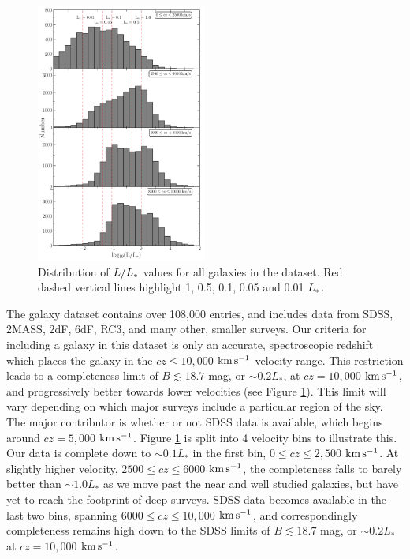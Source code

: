 \documentclass[twocolumn,tighten]{aastex6}
\begin{document}
\begin{figure}[b!]
        \centering
        \vspace{0pt}
        \includegraphics[width=0.50\textwidth]{fig1.pdf}
        \caption{\small{Distribution of $L/L_{\**}$ values for all galaxies in the dataset. Red dashed vertical lines highlight 1, 0.5, 0.1, 0.05 and 0.01 $L_{\**}$.}}
        \label{completeness}
\end{figure} 

The galaxy dataset contains over 108,000 entries, and includes data from SDSS, 2MASS, 2dF, 6dF, RC3, and many other, smaller surveys. Our criteria for including a galaxy in this dataset is only an accurate, spectroscopic redshift which places the galaxy in the $cz \leq 10,000$ $\rm km\, s^{-1}$ velocity range. This restriction leads to a completeness limit of $B \lesssim 18.7$ mag, or $\sim0.2 L_*$, at $cz = 10,000$ $\rm km\, s^{-1}$, and progressively better towards lower velocities (see Figure \ref{completeness}). This limit will vary depending on which major surveys include a particular region of the sky. The major contributor is whether or not SDSS data is available, which begins around $cz = 5,000$ $\rm km\, s^{-1}$. Figure \ref{completeness} is split into 4 velocity bins to illustrate this. Our data is complete down to $\sim0.1 L_*$ in the first bin, $0 \leq cz \leq 2,500$ $\rm km\, s^{-1}$. At slightly higher velocity, $2500 \leq cz \leq 6000$ $\rm km\, s^{-1}$, the completeness falls to barely better than $\sim1.0 L_*$ as we move past the near and well studied galaxies, but have yet to reach the footprint of deep surveys. SDSS data becomes available in the last two bins, spanning $6000 \leq cz \leq 10,000$ $\rm km\, s^{-1}$, and correspondingly completeness remains high down to the SDSS limits of $B \lesssim 18.7$ mag, or $\sim0.2 L_*$ at $cz = 10,000$ $\rm km\, s^{-1}$.
\end{document}
